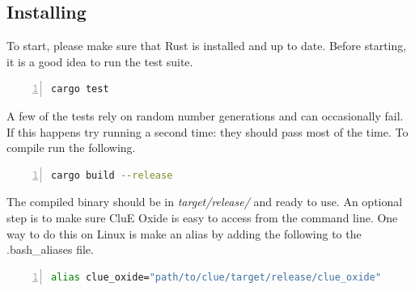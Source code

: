 \documentclass{book}
\begin{document}
\subsection{Installing}
To start, please make sure that Rust is installed and up to date\cite{rust}.
Before starting, it is a good idea to run the test suite.
\begin{lstlisting}[frame=single,numbers=left,language=bash]
cargo test
\end{lstlisting}
A few of the tests rely on random number generations and can occasionally fail.
If this happens try running a second time: they should pass most of the time.
To compile run the following.
\begin{lstlisting}[frame=single,numbers=left,language=bash]
cargo build --release
\end{lstlisting}
The compiled binary should be in \textit{target/release/} and ready to use.
An optional step is to make sure CluE Oxide is easy to access from 
the command line.
One way to do this on Linux is make an alias by adding the following to 
the .bash\_aliases file.
\begin{lstlisting}[frame=single,numbers=left,language=bash]
alias clue_oxide="path/to/clue/target/release/clue_oxide"
\end{lstlisting}

\end{document}
